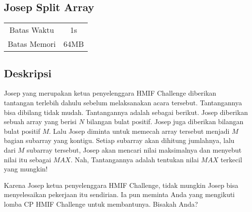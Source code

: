 \documentclass{article}
\begin{document}
\begin{center}
    \section*{Josep Split Array} %

    \begin{tabular}{ | c c | }
        \hline
        Batas Waktu  & 1s \\    %
        Batas Memori & 64MB \\  %
        \hline
    \end{tabular}
\end{center}

\subsection*{Deskripsi}



Josep yang merupakan ketua penyelenggara HMIF Challenge diberikan tantangan
terlebih dahulu sebelum melaksanakan acara tersebut. Tantangannya bisa dibilang tidak mudah. Tantangannya adalah sebagai berikut. 
Josep diberikan sebuah array yang berisi $N$ bilangan bulat positif. Josep juga diberikan bilangan bulat positif $M$. Lalu Josep diminta untuk memecah
array tersebut menjadi $M$ bagian subarray yang kontigu. Setiap subarray akan dihitung jumlahnya, lalu dari $M$ subarray tersebut, Josep akan mencari nilai
maksimalnya dan menyebut nilai itu sebagai $MAX$. Nah, Tantangannya adalah tentukan nilai $MAX$ terkecil yang mungkin!

Karena Josep ketua penyelenggara HMIF Challenge, tidak mungkin Josep bisa menyelesaikan pekerjaan itu sendirian. Ia pun meminta Anda yang mengikuti lomba CP HMIF Challenge
untuk membantunya. Bisakah Anda?


\end{document}
